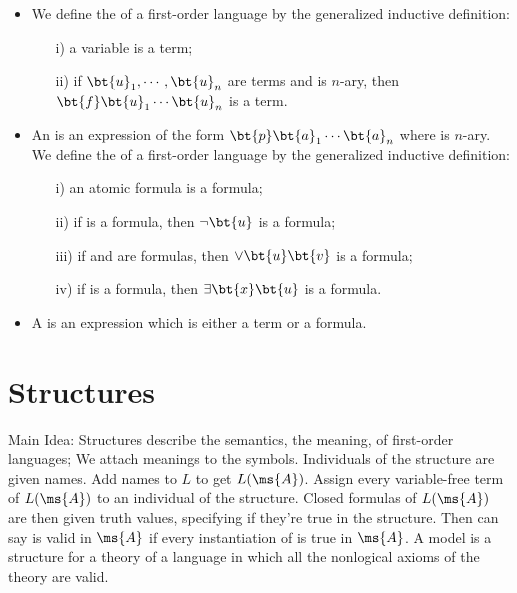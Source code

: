 \begin{definition}[Designators]
	$ $
	\begin{itemize}
		\item We define the  of a 
		first-order language by the generalized inductive 
		definition:
		\begin{enumerate}
			\item[i)] a variable is a term;
				
			\item[ii)] if $\bt{u}_1, \cdots, \bt{u}_n$ are 
			terms and  is $n$-ary, then 
			$\bt{f}\bt{u}_1 \cdots \bt{u}_n$ is a term.
		\end{enumerate}
		
		\item An  is 
		an expression of the form $\bt{p}\bt{a}_1 \cdots \bt{a}_n$ 
		where  is $n$-ary. We define the 
		 of a first-order 
		language by the generalized inductive definition:
		\begin{enumerate}
			\item[i)] an atomic formula is a formula;
			
			\item[ii)] if  is a formula, then $\neg \bt{u}$ 
			is a formula;
			
			\item[iii)] if  and  are formulas, then 
			$\lor \bt{u}\bt{v}$ is a formula;
			
			\item[iv)] if  is a formula, then $\exists \bt{x} 
			\bt{u}$ is a formula.
		\end{enumerate}
		\item A  is an 
		expression which is either a term or a formula.
	\end{itemize}
\end{definition}


\newpage

\section{Structures}

Main Idea: Structures describe the semantics, the meaning, of 
first-order languages; We attach meanings to the symbols. 
Individuals of the structure are given names. Add names to $L$ to 
get $L(\ms{A})$. Assign every variable-free term of $L(\ms{A})$ to 
an individual of the structure. Closed formulas of $L(\ms{A})$ are 
then given truth values, specifying if they're true in the 
structure. Then can say  is valid in $\ms{A}$ if every 
instantiation of  is true in $\ms{A}$. A model is a structure 
for a theory of a language in which all the nonlogical axioms of 
the theory are valid.

